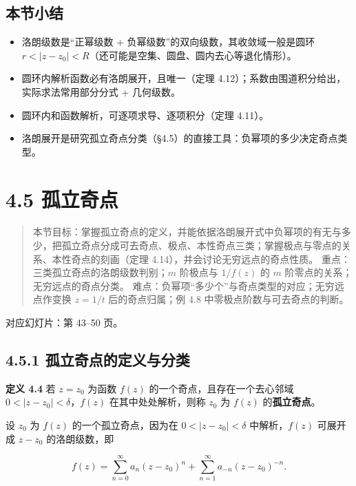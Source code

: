 \subsection{本节小结}\label{ux672cux8282ux5c0fux7ed3-14}

\begin{itemize}
\tightlist
\item
  洛朗级数是``正幂级数 + 负幂级数''的双向级数，其收敛域一般是圆环
  \(r<|z-z_0|<R\)（还可能是空集、圆盘、圆内去心等退化情形）。
\item
  圆环内解析函数必有洛朗展开，且唯一（定理
  4.12）；系数由围道积分给出，实际求法常用部分分式 + 几何级数。
\item
  圆环内和函数解析，可逐项求导、逐项积分（定理 4.11）。
\item
  洛朗展开是研究孤立奇点分类（§4.5）的直接工具：负幂项的多少决定奇点类型。
\end{itemize}

\section{4.5 孤立奇点}\label{ux5b64ux7acbux5947ux70b9}

\begin{quote}
本节目标：掌握孤立奇点的定义，并能依据洛朗展开式中负幂项的有无与多少，把孤立奇点分成可去奇点、极点、本性奇点三类；掌握极点与零点的关系、本性奇点的刻画（定理
4.14），并会讨论无穷远点的奇点性质。
重点：三类孤立奇点的洛朗级数判别；\(m\) 阶极点与 \(1/f(z)\) 的 \(m\)
阶零点的关系；无穷远点的奇点分类。
难点：负幂项``多少个''与奇点类型的对应；无穷远点作变换 \(z=1/t\)
后的奇点归属；例 4.8 中零极点阶数与可去奇点的判断。
\end{quote}

对应幻灯片：第 43--50 页。

\subsection{4.5.1
孤立奇点的定义与分类}\label{ux5b64ux7acbux5947ux70b9ux7684ux5b9aux4e49ux4e0eux5206ux7c7b}

\textbf{定义 4.4} 若 \(z=z_0\) 为函数 \(f(z)\)
的一个奇点，且存在一个去心邻域 \(0<|z-z_0|<\delta\)，\(f(z)\)
在其中处处解析，则称 \(z_0\) 为 \(f(z)\) 的\textbf{孤立奇点}。

设 \(z_0\) 为 \(f(z)\) 的一个孤立奇点，因为在 \(0<|z-z_0|<\delta\)
中解析，\(f(z)\) 可展开成 \(z-z_0\) 的洛朗级数，即

\[
f(z)=\sum_{n=0}^{\infty}a_n(z-z_0)^n+\sum_{n=1}^{\infty}a_{-n}(z-z_0)^{-n}.
\]

